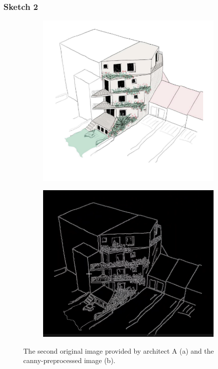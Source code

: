\subsubsection{Sketch 2}
\begin{figure}[H]
    \centering
    \begin{subfigure}[b]{0.3\textwidth}
        \centering
        \includegraphics[width=\textwidth]{Images/Results/Architect-A_unstructured-phase/sketches/sketch_2.png}
        \caption{}
        \label{A-unstructured-1-sketch}
    \end{subfigure}
    \begin{subfigure}[b]{0.3\textwidth}
        \centering 
        \includegraphics[width=\textwidth]{Images/Results/Architect-A_unstructured-phase/sketches/sketch_2_preprocessed.png}
        \caption{}
        \label{A-unstructured-1-sketch-prep}
    \end{subfigure}
    \caption{The second original image provided by architect A (a) and the canny-preprocessed image (b).}
    \label{fig:placeholder}
\end{figure}
